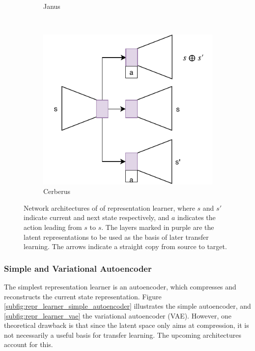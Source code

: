 \begin{figure}[ht!]
\begin{subfigure}{0.5\columnwidth}
		\caption{Janus}
		\label{subfig:repr_learner_janus}
	\end{subfigure}%
	~ 
	\begin{subfigure}{0.5\columnwidth}
		\centering
		\includegraphics[width=\linewidth]{../img/cerberus.pdf}
		\caption{Cerberus}
		\label{subfig:repr_learner_cerberus}
	\end{subfigure}
	\caption{Network architectures of of representation learner, where $s$ and $s'$ indicate current and next state respectively, and $a$ indicates the action leading from $s$ to $s$. 
	The layers marked in purple are the latent representations to be used as the basis of later transfer learning. 
	The arrows indicate a straight copy from source to target.
	}
	\label{fig:repr_learner}
\end{figure}

\subsubsection{Simple and Variational Autoencoder}
The simplest representation learner is an autoencoder, which compresses and reconstructs the current state representation. 
Figure \ref{subfig:repr_learner_simple_autoencoder} illustrates the simple autoencoder, and \ref{subfig:repr_learner_vae} the variational autoencoder (VAE). 
However, one theoretical drawback is that
since the latent space only aims at compression, it is not necessarily a useful basis for transfer learning.
The upcoming architectures account for this.

